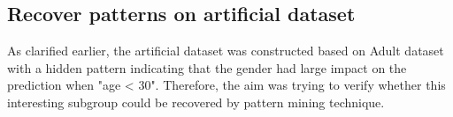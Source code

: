 \subsection{Recover patterns on artificial dataset} 

%

As clarified earlier, the artificial dataset was constructed based on Adult dataset with a hidden pattern indicating that the gender had large impact on the prediction when "age < 30". Therefore, the aim was trying to verify whether this interesting subgroup could be recovered by pattern mining technique. 

